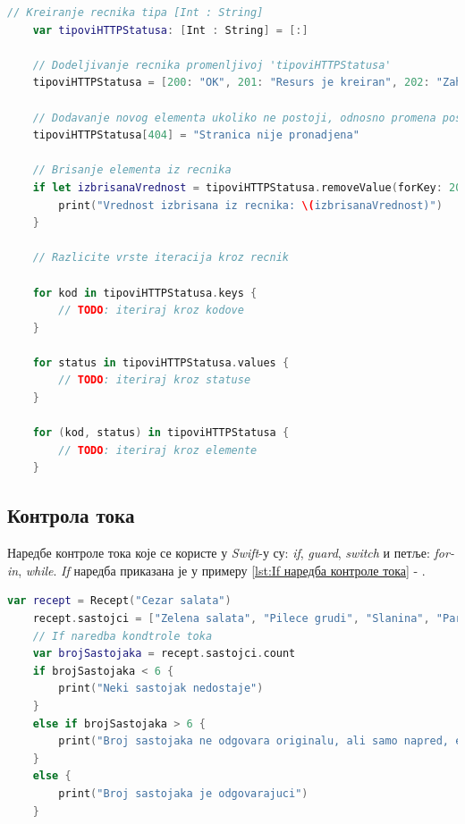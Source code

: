 \documentclass[12pt,oneside]{memoir}
\begin{document}
\begin{lstlisting}[caption=\textit{{Рад са речницима}}, label={lst:Рад са речницима}, language=Swift, frame=single]
    // Kreiranje recnika tipa [Int : String]
    var tipoviHTTPStatusa: [Int : String] = [:]
    
    // Dodeljivanje recnika promenljivoj 'tipoviHTTPStatusa'
    tipoviHTTPStatusa = [200: "OK", 201: "Resurs je kreiran", 202: "Zahtev je prihvacen"]
    
    // Dodavanje novog elementa ukoliko ne postoji, odnosno promena postojeceg
    tipoviHTTPStatusa[404] = "Stranica nije pronadjena"
    
    // Brisanje elementa iz recnika
    if let izbrisanaVrednost = tipoviHTTPStatusa.removeValue(forKey: 201) {
        print("Vrednost izbrisana iz recnika: \(izbrisanaVrednost)")
    }
    
    // Razlicite vrste iteracija kroz recnik
    
    for kod in tipoviHTTPStatusa.keys {
        // TODO: iteriraj kroz kodove
    }
    
    for status in tipoviHTTPStatusa.values {
        // TODO: iteriraj kroz statuse
    }

    for (kod, status) in tipoviHTTPStatusa {
        // TODO: iteriraj kroz elemente
    }
\end{lstlisting}

\subsection{Контрола тока}

\indent Наредбе контроле тока које се користе у \textit{Swift}-у су: \textit{if}, \textit{guard}, \textit{switch} и петље: \textit{for-in}, \textit{while}. \textit{If} наредба приказана је у примеру \ref{lst:If наредба контроле тока} - .

\begin{lstlisting}[caption=\textit{{If наредбa контроле тока}}, label={lst:If наредба контроле тока}, language=Swift, frame=single]
    var recept = Recept("Cezar salata")
    recept.sastojci = ["Zelena salata", "Pilece grudi", "Slanina", "Paradajz", "Hleb", "Cezar premaz"]
    // If naredba kondtrole toka
    var brojSastojaka = recept.sastojci.count
    if brojSastojaka < 6 {
        print("Neki sastojak nedostaje")
    }
    else if brojSastojaka > 6 {
        print("Broj sastojaka ne odgovara originalu, ali samo napred, eksperimentisi")
    }
    else {
        print("Broj sastojaka je odgovarajuci")
    }
\end{lstlisting}
\end{document}
